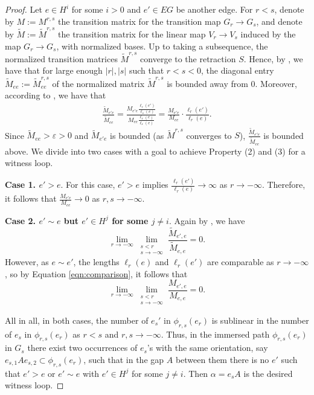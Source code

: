 \documentclass[11pt, letterpaper]{amsart}
\theoremstyle{plain}
\theoremstyle{definition}
\renewcommand{\epsilon}{\varepsilon}
\newcommand{\wt}[1]{\widetilde{#1}}
\begin{document}
\begin{proof}
  Let $e \in H^i$ for some $i>0$ and $e' \in EG$ be another edge. 
   For $r<s$, denote by $M:=M^{r,s}$ the
  transition matrix for the transition map $G_r \to G_s$, and denote by
  $\wt{M}:=\wt{M}^{r,s}$ the transition matrix for the linear map $V_r \to V_s$
  induced by the map $G_r \to G_s$, with normalized bases.
  Up to taking a subsequence, the normalized transition matrices $\wt{M}^{r,s}$
  converge to the retraction $S$.
  Hence, by , we have that for large enough $|r|,|s|$ such that
  $r<s<0$, the diagonal entry $\wt{M}_{ee}:=\wt{M}_{ee}^{r,s}$ of the normalized
  matrix $\wt{M}^{r,s}$ is
  bounded away from 0. Moreover,
  according to , we have that
  \begin{align}\label{eqn:comparison}
    \frac{\wt{M}_{e'e}}{\wt{M}_{ee}} =
    \frac{M_{e'e}\frac{\ell_r(e')}{\ell_s(e)}}{M_{ee}\frac{\ell_r(e)}{\ell_s(e)}}
    = \frac{M_{e'e}}{M_{ee}} \cdot \frac{\ell_r(e')}{\ell_r(e)}  \tag{$\star$}.
  \end{align}
  Since $\wt{M}_{ee}>\epsilon>0$ and $\wt{M}_{e'e}$ is bounded (as $\wt{M}^{r,s}$
  converges to $S$), $\frac{\wt{M}_{e'e}}{\wt{M}_{ee}}$ is bounded above.
  We divide into two cases with a goal to achieve Property (2) and (3) for a
  witness loop.

  \textbf{Case 1. $e'>e$}.
  For this case, $e'>e$ implies $\frac{\ell_r(e')}{\ell_r(e)}\to \infty$ as $r \to
  -\infty$. Therefore, it follows that $\frac{M_{e'e}}{M_{ee}} \to 0$ as $r,s \to -\infty$.

  \textbf{Case 2. $e' \sim e$ but $e' \in H^j$ for some $j \neq i$}.
   Again by
  , we have
  \[
    \lim_{r \to -\infty}\lim_{\substack{s<r\\ s \to
        -\infty}}\frac{\wt{M}_{e',e}}{\wt{M}_{e,e}} = 0.
  \]
  However, as $e \sim e'$, the lengths $\ell_r(e)$ and $\ell_r(e')$ are
  comparable as $r \to -\infty$, so by Equation \eqref{eqn:comparison}, it
  follows that
  \[
    \lim_{r \to -\infty}\lim_{\substack{s<r\\ s \to
        -\infty}}\frac{M_{e',e}}{M_{e,e}} = 0.
  \]
  
  All in all, in both cases, the number of $e_s'$ in $\phi_{r,s}(e_r)$ is sublinear in the number of $e_s$
  in $\phi_{r,s}(e_r)$ as $r<s$ and $r,s \to -\infty$. 
  Thus, in the immersed path $\phi_{r,s}(e_r)$ in $G_s$ there
  exist two occurrences of $e_s$'s with the same
  orientation, say $e_{s,1}Ae_{s,2} \subset \phi_{r,s}(e_r)$, such that in 
  the gap $A$ between them
  there is no $e'$ such that $e'>e$ or $e' \sim e$ with
  $e' \in H^j$ for some $j \neq i$. Then $\alpha=e_sA$ is the desired witness loop.
\end{proof}
\end{document}
